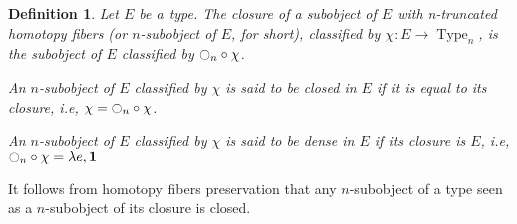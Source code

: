 \documentclass[preprint,9pt,numbers]{sigplanconf}
\newtheorem{defi}[thm]{Definition}
\newcommand{\ie}{i.e,\xspace}
\DeclareMathOperator{\Type}{Type}
\newcommand{\modal}{\ensuremath{\ocircle}}
\newcommand \one {\mathbf{1}}
\newenvironment{mymath}[1][-0em]{%
  \newcommand\mymathaux{\vspace{#1}}%
  \vspace{#1}%
  \begin{equation*}%
  }{ %
    \mymathaux%
  \end{equation*}}
\begin{document}
\begin{defi}
  Let $E$ be a type. The {\em closure} of a subobject of $E$ with
  n-truncated homotopy fibers (or $n$-subobject of $E$, for short),
  classified by $\chi : E \to \Type_n$, is the subobject of $E$
  classified by $\modal_n \circ \chi$.

  An $n$-subobject of $E$ classified by $\chi$ is said to be {\em
    closed in $E$} if it is equal to its closure, \ie
  $\chi = \modal_n \circ \chi$.

  An $n$-subobject of $E$ classified by $\chi$ is said to be {\em
    dense in $E$} if its closure is $E$, \ie
  $\modal_n \circ \chi = \lambda e, \one$ 
\end{defi}



It follows from homotopy fibers preservation that any $n$-subobject of
a type seen as a $n$-subobject of its closure is closed.
\end{document}
